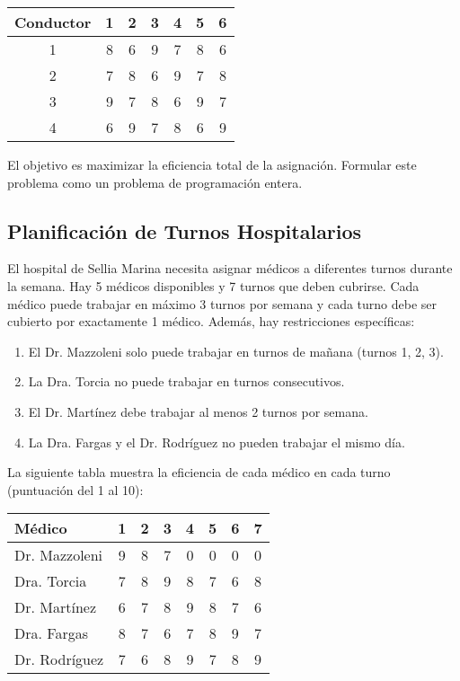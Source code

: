 \documentclass[12pt]{article}
\begin{document}
\begin{table}[h]
\centering
\begin{tabular}{ccccccc}
\toprule
\textbf{Conductor} & \textbf{1} & \textbf{2} & \textbf{3} & \textbf{4} & \textbf{5} & \textbf{6} \\
\midrule
1 & 8 & 6 & 9 & 7 & 8 & 6 \\
2 & 7 & 8 & 6 & 9 & 7 & 8 \\
3 & 9 & 7 & 8 & 6 & 9 & 7 \\
4 & 6 & 9 & 7 & 8 & 6 & 9 \\
\bottomrule
\end{tabular}
\end{table}

El objetivo es maximizar la eficiencia total de la asignación. Formular este problema como un problema de programación entera.

\subsection{Planificación de Turnos Hospitalarios}
El hospital de Sellia Marina necesita asignar médicos a diferentes turnos durante la semana. Hay 5 médicos disponibles y 7 turnos que deben cubrirse. Cada médico puede trabajar en máximo 3 turnos por semana y cada turno debe ser cubierto por exactamente 1 médico. Además, hay restricciones específicas:

\begin{enumerate}[label=\arabic*.]
    \item El Dr. Mazzoleni solo puede trabajar en turnos de mañana (turnos 1, 2, 3).
    \item La Dra. Torcia no puede trabajar en turnos consecutivos.
    \item El Dr. Martínez debe trabajar al menos 2 turnos por semana.
    \item La Dra. Fargas y el Dr. Rodríguez no pueden trabajar el mismo día.
\end{enumerate}

La siguiente tabla muestra la eficiencia de cada médico en cada turno (puntuación del 1 al 10):

\begin{table}[h]
\centering
\begin{tabular}{lccccccc}
\toprule
\textbf{Médico} & \textbf{1} & \textbf{2} & \textbf{3} & \textbf{4} & \textbf{5} & \textbf{6} & \textbf{7} \\
\midrule
Dr. Mazzoleni & 9 & 8 & 7 & 0 & 0 & 0 & 0 \\
Dra. Torcia & 7 & 8 & 9 & 8 & 7 & 6 & 8 \\
Dr. Martínez & 6 & 7 & 8 & 9 & 8 & 7 & 6 \\
Dra. Fargas & 8 & 7 & 6 & 7 & 8 & 9 & 7 \\
Dr. Rodríguez & 7 & 6 & 8 & 9 & 7 & 8 & 9 \\
\bottomrule
\end{tabular}
\end{table}
\end{document}
